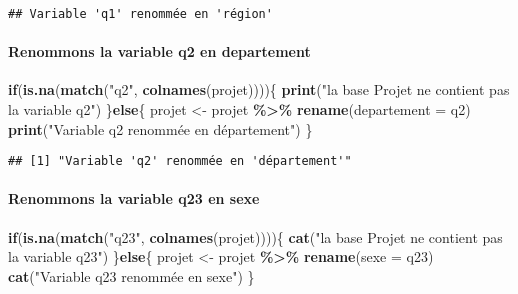 \documentclass[
]{article}
\newenvironment{Shaded}{\begin{snugshade}}{\end{snugshade}}
\newcommand{\AttributeTok}[1]{\textcolor[rgb]{0.13,0.29,0.53}{#1}}
\newcommand{\ControlFlowTok}[1]{\textcolor[rgb]{0.13,0.29,0.53}{\textbf{#1}}}
\newcommand{\FunctionTok}[1]{\textcolor[rgb]{0.13,0.29,0.53}{\textbf{#1}}}
\newcommand{\NormalTok}[1]{#1}
\newcommand{\OtherTok}[1]{\textcolor[rgb]{0.56,0.35,0.01}{#1}}
\newcommand{\SpecialCharTok}[1]{\textcolor[rgb]{0.81,0.36,0.00}{\textbf{#1}}}
\newcommand{\StringTok}[1]{\textcolor[rgb]{0.31,0.60,0.02}{#1}}
\begin{document}
\begin{verbatim}
## Variable 'q1' renommée en 'région'
\end{verbatim}

\hypertarget{renommons-la-variable-q2-en-departement}{%
\paragraph{\texorpdfstring{Renommons la variable \textbf{q2} en
\textbf{departement}}{Renommons la variable q2 en departement}}\label{renommons-la-variable-q2-en-departement}}

\begin{Shaded}
\begin{Highlighting}[]
\ControlFlowTok{if}\NormalTok{(}\FunctionTok{is.na}\NormalTok{(}\FunctionTok{match}\NormalTok{(}\StringTok{"q2"}\NormalTok{, }\FunctionTok{colnames}\NormalTok{(projet))))\{}
  \FunctionTok{print}\NormalTok{(}\StringTok{"la base \textquotesingle{}Projet\textquotesingle{} ne contient pas la variable \textquotesingle{}q2\textquotesingle{}"}\NormalTok{)}
\NormalTok{\}}\ControlFlowTok{else}\NormalTok{\{}
\NormalTok{  projet }\OtherTok{\textless{}{-}}\NormalTok{ projet }\SpecialCharTok{\%\textgreater{}\%}
  \FunctionTok{rename}\NormalTok{(}\AttributeTok{departement =}\NormalTok{ q2)}
  \FunctionTok{print}\NormalTok{(}\StringTok{"Variable \textquotesingle{}q2\textquotesingle{} renommée en \textquotesingle{}département\textquotesingle{}"}\NormalTok{)}
\NormalTok{\}}
\end{Highlighting}
\end{Shaded}

\begin{verbatim}
## [1] "Variable 'q2' renommée en 'département'"
\end{verbatim}

\hypertarget{renommons-la-variable-q23-en-sexe}{%
\paragraph{\texorpdfstring{Renommons la variable \textbf{q23} en
\textbf{sexe}}{Renommons la variable q23 en sexe}}\label{renommons-la-variable-q23-en-sexe}}

\begin{Shaded}
\begin{Highlighting}[]
\ControlFlowTok{if}\NormalTok{(}\FunctionTok{is.na}\NormalTok{(}\FunctionTok{match}\NormalTok{(}\StringTok{"q23"}\NormalTok{, }\FunctionTok{colnames}\NormalTok{(projet))))\{}
  \FunctionTok{cat}\NormalTok{(}\StringTok{"la base \textquotesingle{}Projet\textquotesingle{} ne contient pas la variable \textquotesingle{}q23\textquotesingle{}"}\NormalTok{)}
\NormalTok{\}}\ControlFlowTok{else}\NormalTok{\{}
\NormalTok{  projet }\OtherTok{\textless{}{-}}\NormalTok{ projet }\SpecialCharTok{\%\textgreater{}\%}
  \FunctionTok{rename}\NormalTok{(}\AttributeTok{sexe =}\NormalTok{ q23)}
  \FunctionTok{cat}\NormalTok{(}\StringTok{"Variable \textquotesingle{}q23\textquotesingle{} renommée en \textquotesingle{}sexe\textquotesingle{}"}\NormalTok{)}
\NormalTok{\}}
\end{Highlighting}
\end{Shaded}
\end{document}
